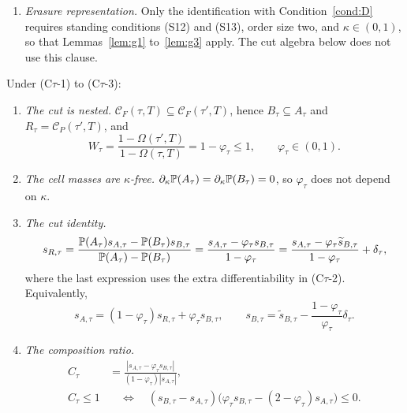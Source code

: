 \begin{corollary}
\begin{enumerate}[label=(C$\tau$-\arabic*),leftmargin=3.8em,itemsep=3pt]
  hypotheses of Proposition~\ref{prop:factorisation}, including flagged-endpoint invariance, hold
  at both thresholds.
\item \emph{Erasure representation.} Only the identification with
  Condition~\ref{cond:D} requires standing conditions (S12) and (S13), order size two, and
  $\kappa\in(0,1)$, so that Lemmas~\ref{lem:g1} to~\ref{lem:g3} apply. The cut algebra below does
  not use this clause.
\end{enumerate}
Under (C$\tau$-1) to (C$\tau$-3):
\begin{enumerate}[label=(\roman*),leftmargin=2.4em,itemsep=3pt]
\item \emph{The cut is nested.}
  $\mathcal C_F(\tau,T)\subseteq\mathcal C_F(\tau',T)$, hence
  $B_\tau\subseteq A_\tau$ and $R_\tau=\mathcal C_P(\tau',T)$, and
  \begin{equation}
  \label{eq:caught-tau-W}
  W_\tau=\frac{1-\Omega(\tau',T)}{1-\Omega(\tau,T)}
  =1-\varphi_\tau\le1,
  \qquad \varphi_\tau\in(0,1).
  \end{equation}
\item \emph{The cell masses are $\kappa$-free.}
  $\partial_\kappa\mathbb{P}(A_\tau)=\partial_\kappa\mathbb{P}(B_\tau)=0$, so
  $\varphi_\tau$ does not depend on $\kappa$.
\item \emph{The cut identity.}
  \begin{equation}
  \label{eq:caught-tau-identity}
  s_{R,\tau}
  =\frac{\mathbb{P}(A_\tau)s_{A,\tau}-\mathbb{P}(B_\tau)s_{B,\tau}}
  {\mathbb{P}(A_\tau)-\mathbb{P}(B_\tau)}
  =\frac{s_{A,\tau}-\varphi_\tau s_{B,\tau}}{1-\varphi_\tau}
  =\frac{s_{A,\tau}-\varphi_\tau\widetilde s_{B,\tau}}{1-\varphi_\tau}
  +\delta_\tau,
  \end{equation}
  where the last expression uses the extra differentiability in (C$\tau$-2). Equivalently,
  \begin{equation}
  \label{eq:caught-tau-average}
  s_{A,\tau}=(1-\varphi_\tau)s_{R,\tau}+\varphi_\tau s_{B,\tau},
  \qquad
  s_{B,\tau}=\widetilde s_{B,\tau}
  -\frac{1-\varphi_\tau}{\varphi_\tau}\delta_\tau.
  \end{equation}
\item \emph{The composition ratio.}
  \begin{equation}
  \label{eq:caught-tau-C}
  \begin{aligned}
  C_\tau&=\frac{|s_{A,\tau}-\varphi_\tau s_{B,\tau}|}
  {(1-\varphi_\tau)|s_{A,\tau}|},\\
  C_\tau\le1
  &\quad\Longleftrightarrow\quad
  (s_{B,\tau}-s_{A,\tau})
  \bigl(\varphi_\tau s_{B,\tau}-(2-\varphi_\tau)s_{A,\tau}\bigr)\le0.

\end{aligned}
\end{equation}
\end{enumerate}
\end{corollary}
